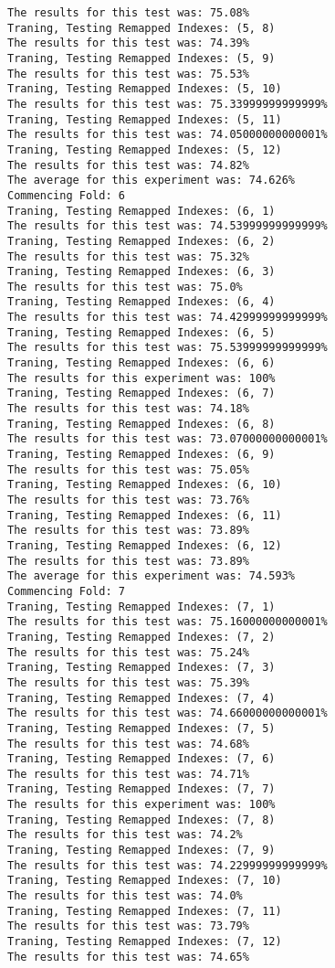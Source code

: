 \begin{lstlisting}[basicstyle=\tiny]
The results for this test was: 75.08%
Traning, Testing Remapped Indexes: (5, 8)
The results for this test was: 74.39%
Traning, Testing Remapped Indexes: (5, 9)
The results for this test was: 75.53%
Traning, Testing Remapped Indexes: (5, 10)
The results for this test was: 75.33999999999999%
Traning, Testing Remapped Indexes: (5, 11)
The results for this test was: 74.05000000000001%
Traning, Testing Remapped Indexes: (5, 12)
The results for this test was: 74.82%
The average for this experiment was: 74.626%
Commencing Fold: 6
Traning, Testing Remapped Indexes: (6, 1)
The results for this test was: 74.53999999999999%
Traning, Testing Remapped Indexes: (6, 2)
The results for this test was: 75.32%
Traning, Testing Remapped Indexes: (6, 3)
The results for this test was: 75.0%
Traning, Testing Remapped Indexes: (6, 4)
The results for this test was: 74.42999999999999%
Traning, Testing Remapped Indexes: (6, 5)
The results for this test was: 75.53999999999999%
Traning, Testing Remapped Indexes: (6, 6)
The results for this experiment was: 100%
Traning, Testing Remapped Indexes: (6, 7)
The results for this test was: 74.18%
Traning, Testing Remapped Indexes: (6, 8)
The results for this test was: 73.07000000000001%
Traning, Testing Remapped Indexes: (6, 9)
The results for this test was: 75.05%
Traning, Testing Remapped Indexes: (6, 10)
The results for this test was: 73.76%
Traning, Testing Remapped Indexes: (6, 11)
The results for this test was: 73.89%
Traning, Testing Remapped Indexes: (6, 12)
The results for this test was: 73.89%
The average for this experiment was: 74.593%
Commencing Fold: 7
Traning, Testing Remapped Indexes: (7, 1)
The results for this test was: 75.16000000000001%
Traning, Testing Remapped Indexes: (7, 2)
The results for this test was: 75.24%
Traning, Testing Remapped Indexes: (7, 3)
The results for this test was: 75.39%
Traning, Testing Remapped Indexes: (7, 4)
The results for this test was: 74.66000000000001%
Traning, Testing Remapped Indexes: (7, 5)
The results for this test was: 74.68%
Traning, Testing Remapped Indexes: (7, 6)
The results for this test was: 74.71%
Traning, Testing Remapped Indexes: (7, 7)
The results for this experiment was: 100%
Traning, Testing Remapped Indexes: (7, 8)
The results for this test was: 74.2%
Traning, Testing Remapped Indexes: (7, 9)
The results for this test was: 74.22999999999999%
Traning, Testing Remapped Indexes: (7, 10)
The results for this test was: 74.0%
Traning, Testing Remapped Indexes: (7, 11)
The results for this test was: 73.79%
Traning, Testing Remapped Indexes: (7, 12)
The results for this test was: 74.65%

\end{lstlisting}
